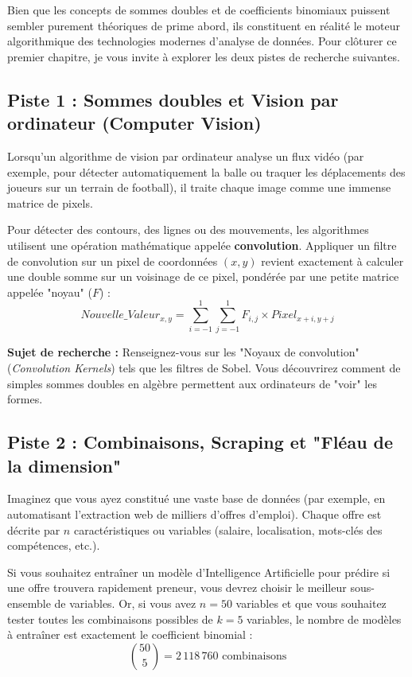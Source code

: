 \documentclass[12pt,a4paper]{report}
\begin{document}
Bien que les concepts de sommes doubles et de coefficients binomiaux puissent sembler purement théoriques de prime abord, ils constituent en réalité le moteur algorithmique des technologies modernes d'analyse de données. Pour clôturer ce premier chapitre, je vous invite à explorer les deux pistes de recherche suivantes.

\subsection*{Piste 1 : Sommes doubles et Vision par ordinateur (Computer Vision)}
Lorsqu'un algorithme de vision par ordinateur analyse un flux vidéo (par exemple, pour détecter automatiquement la balle ou traquer les déplacements des joueurs sur un terrain de football), il traite chaque image comme une immense matrice de pixels. 

Pour détecter des contours, des lignes ou des mouvements, les algorithmes utilisent une opération mathématique appelée \textbf{convolution}. Appliquer un filtre de convolution sur un pixel de coordonnées $(x,y)$ revient exactement à calculer une double somme sur un voisinage de ce pixel, pondérée par une petite matrice appelée "noyau" ($F$) :
$$ Nouvelle\_Valeur_{x,y} = \sum_{i=-1}^{1} \sum_{j=-1}^{1} F_{i,j} \times Pixel_{x+i, y+j} $$



\textbf{Sujet de recherche :} Renseignez-vous sur les "Noyaux de convolution" (\textit{Convolution Kernels}) tels que les filtres de Sobel. Vous découvrirez comment de simples sommes doubles en algèbre permettent aux ordinateurs de "voir" les formes.

\subsection*{Piste 2 : Combinaisons, Scraping et "Fléau de la dimension"}
Imaginez que vous ayez constitué une vaste base de données (par exemple, en automatisant l'extraction web de milliers d'offres d'emploi). Chaque offre est décrite par $n$ caractéristiques ou variables (salaire, localisation, mots-clés des compétences, etc.). 

Si vous souhaitez entraîner un modèle d'Intelligence Artificielle pour prédire si une offre trouvera rapidement preneur, vous devrez choisir le meilleur sous-ensemble de variables. Or, si vous avez $n=50$ variables et que vous souhaitez tester toutes les combinaisons possibles de $k=5$ variables, le nombre de modèles à entraîner est exactement le coefficient binomial :
$$ \binom{50}{5} = 2\,118\,760 \text{ combinaisons} $$
\end{document}
